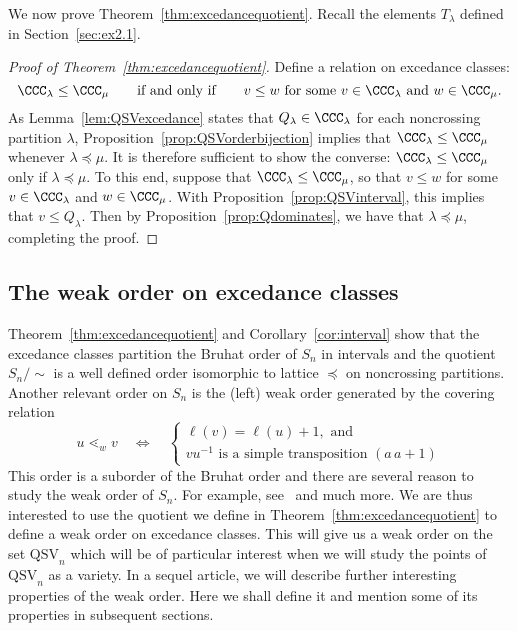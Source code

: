 \documentclass[12pt]{amsart}
\theoremstyle{definition}
\theoremstyle{remark}
\numberwithin{equation}{section}
\newcommand{\QSV}{\mathrm{QSV}}
\begin{document}
We now prove Theorem~\ref{thm:excedancequotient}.  Recall the elements $T_{\lambda}$ defined in Section~\ref{sec:ex2.1}.

\begin{proof}[Proof of Theorem~\ref{thm:excedancequotient}]
Define a relation on excedance classes:
\[
\CCC_{\lambda} \le \CCC_{\mu}
\qquad\text{if and only if}\qquad
\text{$v \le w$ for some $v \in \CCC_{\lambda}$ and $w \in \CCC_{\mu}$}.
\]
As Lemma~\ref{lem:QSVexcedance} states that $Q_{\lambda} \in \CCC_{\lambda}$ for each noncrossing partition $\lambda$, Proposition~\ref{prop:QSVorderbijection} implies that $\CCC_{\lambda} \le \CCC_{\mu}$ whenever $\lambda \preceq \mu$.  It is therefore sufficient to show the converse: $\CCC_{\lambda} \le \CCC_{\mu}$ only if $\lambda \preceq \mu$.  To this end, suppose that $\CCC_{\lambda} \le \CCC_{\mu}$, so that $v \le w$ for some $v \in \CCC_{\lambda}$ and $w \in \CCC_{\mu}$.  With Proposition~\ref{prop:QSVinterval}, this implies that $v \le Q_{\lambda}$.  Then by Proposition~\ref{prop:Qdominates}, we have that $\lambda \preceq \mu$, completing the proof.
\end{proof}

\subsection{The weak order on excedance classes}
\label{sec:weakorder}

Theorem~\ref{thm:excedancequotient} and Corollary~\ref{cor:interval} show that the excedance classes partition the Bruhat order of $S_n$ in intervals and the quotient $S_n/\!\!\sim$ is a 
well defined order isomorphic to lattice $\preceq$ on noncrossing partitions. Another relevant order on $S_n$ is the (left) weak order generated by the  covering relation
	$$u\lessdot_w v \quad\iff\quad  \begin{cases} \ell(v)=\ell(u)+1, \text{ and } \\ vu^{-1} \text{ is a simple transposition } (a\, a+1) \end{cases}$$
This order is a suborder of the Bruhat order and there are several reason to study the weak order of $S_n$. For example, see~\cite{A,B,C} and much more. 
We are thus interested to use the quotient we define in Theorem~\ref{thm:excedancequotient} to define a weak order on excedance classes.
This will give us a weak order on the set $\QSV_n$ which will be of particular interest when we will study the points of $\QSV_n$ as a variety.  
In a sequel article, we will describe further interesting properties of the weak order. Here we shall define it and mention some of its properties in subsequent sections.
\end{document}
